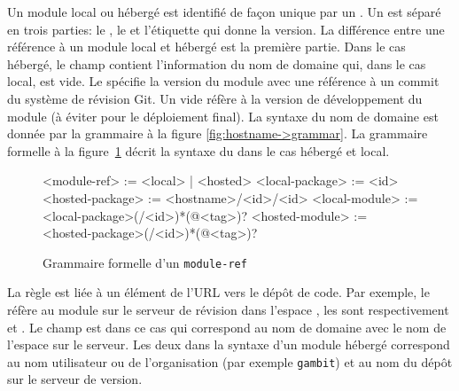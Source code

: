 Un module local ou hébergé est identifié de façon unique par un
.  Un  est séparé en trois parties: le
, le  et l'étiquette qui donne la version.  La
différence entre une référence à un module local et hébergé est la première
partie. Dans le cas hébergé, le champ  contient l'information
du nom de domaine qui, dans le cas local, est vide.  Le 
spécifie la version du module avec une référence à un commit du système de
révision Git. Un  vide réfère à la version de développement du
module (à éviter pour le déploiement final).  La syntaxe du nom de domaine est
donnée par la grammaire à la figure \ref{fig:hostname->grammar}.  La grammaire
formelle à la figure~\ref{fig:module-ref->grammar} décrit la syntaxe du
 dans le cas hébergé et local.\\

\begin{figure}[ht]
  \lstset{frame=single}
  \fontsize{12}{10}
  \begin{mplisting}{0.8}
<module-ref>       := <local> | <hosted>
<local-package>    := <id>
<hosted-package>   := <hostname>/<id>/<id>
<local-module>     := <local-package>(/<id>)*(@<tag>)?
<hosted-module>    := <hosted-package>(/<id>)*(@<tag>)?
\end{mplisting}
  \caption{Grammaire formelle d'un \texttt{module-ref}}
  \label{fig:module-ref->grammar}
\end{figure}

La règle  est liée à un élément de l'URL vers le dépôt de
code. Par exemple, le  
réfère au module  sur le serveur de révision
 dans l'espace , les  sont
respectivement  et . Le champ  est
dans ce cas  qui correspond au nom de domaine avec
le nom de l'espace sur le serveur. Les deux  dans la syntaxe
d'un module hébergé correspond au nom utilisateur ou de l'organisation (par
exemple \texttt{gambit}) et au nom du dépôt sur le serveur de version.


